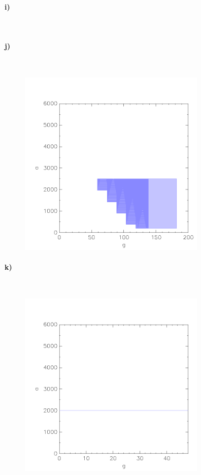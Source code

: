 \paragraph{i)}\mbox{} \\

\paragraph{j)}\mbox{} \\
	\begin{figure}[H]
	\centering
	\includegraphics[width=0.8\textwidth]{Aufgabe_j).png}
\end{figure}

\paragraph{k)}\mbox{} \\

	\begin{figure}[H]
	\centering
	\includegraphics[width=0.8\textwidth]{Aufgabe_k).png}
\end{figure}